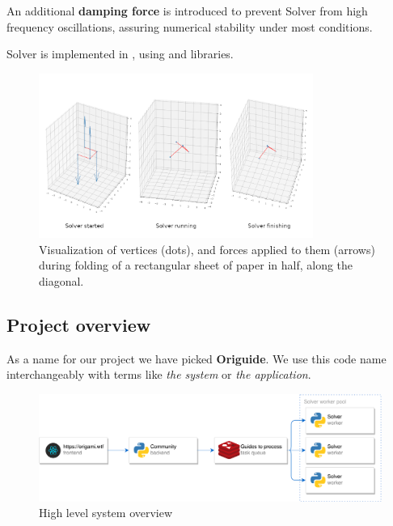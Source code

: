 An additional \textbf{damping force} is introduced to prevent Solver from
high frequency oscillations, assuring numerical stability under most conditions.
\smallskip

Solver is implemented in , using  and  libraries. 


\begin{figure}[H]
	\caption{Visualization of vertices (dots), and forces applied to them (arrows)
	during folding of a rectangular sheet of paper in half, along the diagonal. }
  \centering
    \includegraphics[width=0.8\textwidth]{assets/prototype-backend.png}
\end{figure}


\subsection{Project overview}
\label{section:project-overview}

As a name for our project we have picked \textbf{Origuide}.
We use this code name interchangeably with terms like \textit{the system} or \textit{the application}.
\smallskip

\begin{figure}[H]
	\caption{High level system overview}
  \centering
    \includegraphics[width=\textwidth]{assets/architecture.png}
\end{figure}

